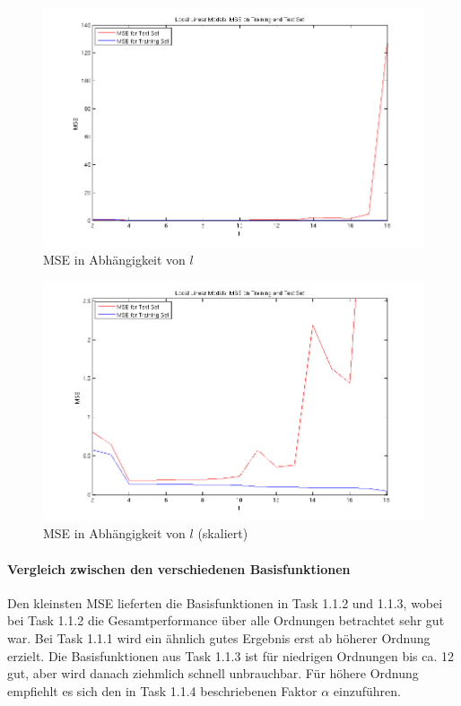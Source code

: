 \begin{figure}[h!]
  \centering
  \includegraphics[width=\textwidth]{./figures/1_1_3_mse_out.png}
  \caption{MSE in Abhängigkeit von $l$}
  \label{fig:113-mse-out}
\end{figure}

\begin{figure}[h!]
  \centering
  \includegraphics[width=\textwidth]{./figures/1_1_3_mse_in.png}
  \caption{MSE in Abhängigkeit von $l$ (skaliert)}
  \label{fig:113-mse-in}
\end{figure}

\clearpage

\paragraph{Vergleich zwischen den verschiedenen Basisfunktionen}

Den kleinsten MSE lieferten die Basisfunktionen in Task 1.1.2 und 1.1.3, wobei bei Task 1.1.2 die Gesamtperformance
über alle Ordnungen betrachtet sehr gut war. Bei Task 1.1.1 wird ein ähnlich gutes Ergebnis erst ab höherer Ordnung
erzielt. Die Basisfunktionen aus Task 1.1.3 ist für niedrigen Ordnungen bis ca. 12 gut, aber wird danach ziehmlich
schnell unbrauchbar. Für höhere Ordnung empfiehlt es sich den in Task 1.1.4 beschriebenen Faktor $\alpha$ einzuführen.
